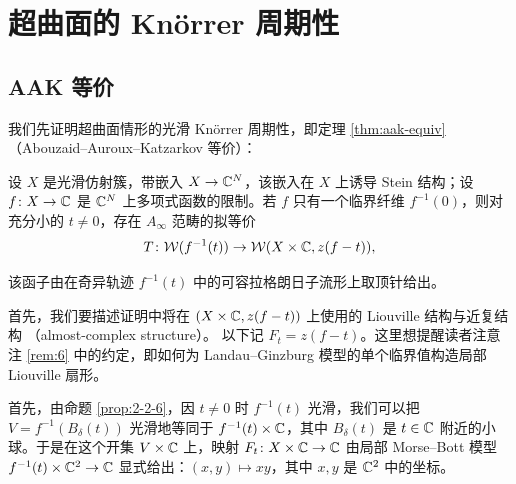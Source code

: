 \section{超曲面的 Kn{\"o}rrer 周期性}

\subsection{AAK 等价}

我们先证明超曲面情形的光滑 Kn{\"o}rrer 周期性，即定理 \ref{thm:aak-equiv}（Abouzaid--Auroux--Katzarkov 等价）：

\begin{thmstar}
设 $X$ 是光滑仿射簇，带嵌入 $X\to\mathbb{C}^N$，该嵌入在 $X$ 上诱导 Stein 结构；设
$f\colon X\to\mathbb{C}$ 是 $\mathbb{C}^N$ 上多项式函数的限制。若 $f$ 只有一个临界纤维
$f^{-1}(0)$，则对充分小的 $t\neq0$，存在 $A_\infty$ 范畴的拟等价
\[
T\colon\mathcal{W}(f^{-1}(t))\to\mathcal{W}(X\times\mathbb{C},z(f-t)),
\]
\end{thmstar}


该函子由在奇异轨迹 $f^{-1}(t)$ 中的可容拉格朗日子流形上取顶针给出。

首先，我们要描述证明中将在 $(X\times\mathbb{C},z(f-t))$ 上使用的 Liouville 结构与近复结构
（almost-complex structure）。
以下记 $F_t=z(f-t)$。这里想提醒读者注意注 \ref{rem:6} 中的约定，即如何为
Landau--Ginzburg 模型的单个临界值构造局部 Liouville 扇形。


首先，由命题 \ref{prop:2-2-6}，因 $t\neq0$ 时 $f^{-1}(t)$ 光滑，我们可以把
$V=f^{-1}(B_\delta(t))$ 光滑地等同于 $f^{-1}(t)\times\mathbb{C}$，其中 $B_\delta(t)$ 是
$t\in\mathbb{C}$ 附近的小球。于是在这个开集 $V\times\mathbb{C}$ 上，映射
$F_t\colon X\times\mathbb{C}\to\mathbb{C}$ 由局部 Morse--Bott 模型
$f^{-1}(t)\times\mathbb{C}^2\to\mathbb{C}$ 显式给出：$(x,y)\mapsto xy$，其中 $x,y$ 是 $\mathbb{C}^2$ 中的坐标。

